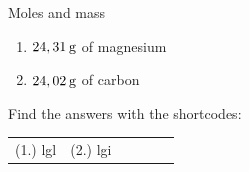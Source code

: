 \begin{exercises}{Moles and mass
      }
\begin{enumerate}[noitemsep, label=\textbf{\arabic*}. ]
\begin{enumerate}[noitemsep, label=\textbf{\alph*}. ]
\label{m38717*uid7}\item $24,31\phantom{\rule{2pt}{0ex}}\text{g}$ of magnesium
\label{m38717*uid8}\item $24,02\phantom{\rule{2pt}{0ex}}\text{g}$ of carbon
\end{enumerate}
                \end{enumerate}
    \label{m38717*cid3}
\par {} Find the answers with the shortcodes:
 \par \begin{tabular}[h]{cccccc}
 (1.) lgl  &  (2.) lgi  & \end{tabular}
\end{exercises}
